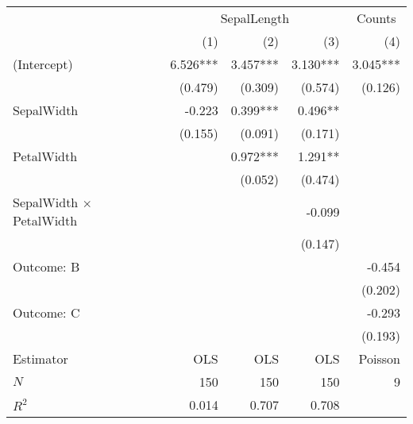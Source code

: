 \begin{tabular}{lrrrr}
\toprule
                               & \multicolumn{3}{c}{SepalLength} & \multicolumn{1}{c}{Counts} \\ 
\cmidrule(lr){2-4} \cmidrule(lr){5-5} 
                               &      (1) &      (2) &       (3) &                        (4) \\ 
\midrule
(Intercept)                    & 6.526*** & 3.457*** &  3.130*** &                   3.045*** \\ 
                               &  (0.479) &  (0.309) &   (0.574) &                    (0.126) \\ 
SepalWidth                     &   -0.223 & 0.399*** &   0.496** &                            \\ 
                               &  (0.155) &  (0.091) &   (0.171) &                            \\ 
PetalWidth                     &          & 0.972*** &   1.291** &                            \\ 
                               &          &  (0.052) &   (0.474) &                            \\ 
SepalWidth $\times$ PetalWidth &          &          &    -0.099 &                            \\ 
                               &          &          &   (0.147) &                            \\ 
Outcome: B                     &          &          &           &                     -0.454 \\ 
                               &          &          &           &                    (0.202) \\ 
Outcome: C                     &          &          &           &                     -0.293 \\ 
                               &          &          &           &                    (0.193) \\ 
\midrule
Estimator                      &      OLS &      OLS &       OLS &                    Poisson \\ 
\midrule
$N$                            &      150 &      150 &       150 &                          9 \\ 
$R^2$                          &    0.014 &    0.707 &     0.708 &                            \\ 
\bottomrule
\end{tabular}
